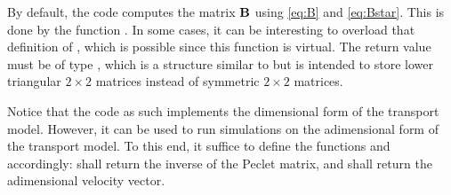 By default, the code computes the matrix $\mathbf B$ using \eqref{eq:B} and \eqref{eq:Bstar}. This is done by the function . In some cases, it can be interesting to overload that definition of , which is possible since this function is virtual. The return value must be of type , which is a structure similar to  but is intended to store lower triangular $2\times2$ matrices instead of symmetric $2\times2$ matrices.

Notice that the code as such implements the dimensional form of the transport model. However, it can be used to run simulations on the adimensional form of the transport model. To this end, it suffice to define the functions  and  accordingly:  shall return the inverse of the Peclet matrix, and  shall return the adimensional velocity vector.

